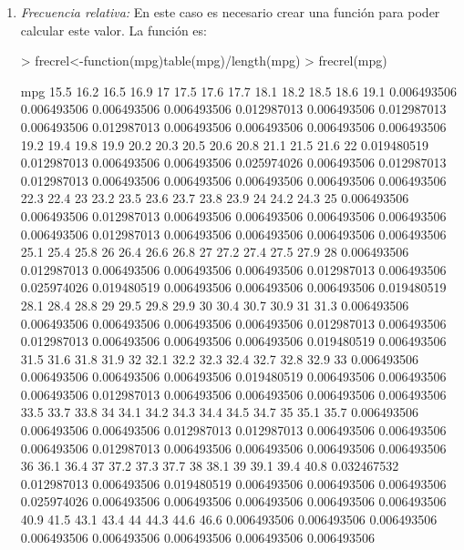 \documentclass [a4paper] {article}
\begin{document}
\begin{enumerate}
\item
\textit{Frecuencia relativa: }En este caso es necesario crear una funci\'on
para poder calcular este valor. La funci\'on es:
\begin{Schunk}
\begin{Sinput}
> frecrel<-function(mpg){table(mpg)/length(mpg)}
> frecrel(mpg)
\end{Sinput}
\begin{Soutput}
mpg
       15.5        16.2        16.5        16.9          17        17.5        17.6        17.7        18.1        18.2        18.5        18.6        19.1 
0.006493506 0.006493506 0.006493506 0.006493506 0.012987013 0.006493506 0.012987013 0.006493506 0.012987013 0.006493506 0.006493506 0.006493506 0.006493506 
       19.2        19.4        19.8        19.9        20.2        20.3        20.5        20.6        20.8        21.1        21.5        21.6          22 
0.019480519 0.012987013 0.006493506 0.006493506 0.025974026 0.006493506 0.012987013 0.012987013 0.006493506 0.006493506 0.006493506 0.006493506 0.006493506 
       22.3        22.4          23        23.2        23.5        23.6        23.7        23.8        23.9          24        24.2        24.3          25 
0.006493506 0.006493506 0.012987013 0.006493506 0.006493506 0.006493506 0.006493506 0.006493506 0.012987013 0.006493506 0.006493506 0.006493506 0.006493506 
       25.1        25.4        25.8          26        26.4        26.6        26.8          27        27.2        27.4        27.5        27.9          28 
0.006493506 0.012987013 0.006493506 0.006493506 0.006493506 0.012987013 0.006493506 0.025974026 0.019480519 0.006493506 0.006493506 0.006493506 0.019480519 
       28.1        28.4        28.8          29        29.5        29.8        29.9          30        30.4        30.7        30.9          31        31.3 
0.006493506 0.006493506 0.006493506 0.006493506 0.006493506 0.012987013 0.006493506 0.012987013 0.006493506 0.006493506 0.006493506 0.019480519 0.006493506 
       31.5        31.6        31.8        31.9          32        32.1        32.2        32.3        32.4        32.7        32.8        32.9          33 
0.006493506 0.006493506 0.006493506 0.006493506 0.019480519 0.006493506 0.006493506 0.006493506 0.012987013 0.006493506 0.006493506 0.006493506 0.006493506 
       33.5        33.7        33.8          34        34.1        34.2        34.3        34.4        34.5        34.7          35        35.1        35.7 
0.006493506 0.006493506 0.006493506 0.012987013 0.012987013 0.006493506 0.006493506 0.006493506 0.012987013 0.006493506 0.006493506 0.006493506 0.006493506 
         36        36.1        36.4          37        37.2        37.3        37.7          38        38.1          39        39.1        39.4        40.8 
0.032467532 0.012987013 0.006493506 0.019480519 0.006493506 0.006493506 0.006493506 0.025974026 0.006493506 0.006493506 0.006493506 0.006493506 0.006493506 
       40.9        41.5        43.1        43.4          44        44.3        44.6        46.6 
0.006493506 0.006493506 0.006493506 0.006493506 0.006493506 0.006493506 0.006493506 0.006493506 
\end{Soutput}
\end{Schunk}


\end{enumerate}
\end{document}
